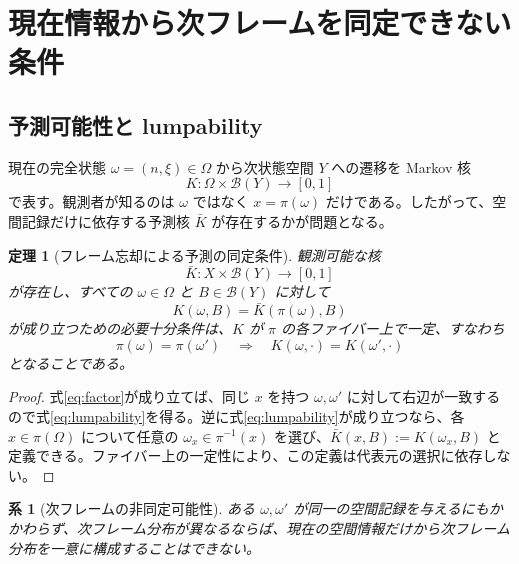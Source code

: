\documentclass[a4paper,11pt]{ltjsarticle}
\newtheorem{theorem}[definition]{定理}
\newtheorem{corollary}[definition]{系}
\theoremstyle{remark}
\begin{document}
\section{現在情報から次フレームを同定できない条件}

\subsection{予測可能性と lumpability}
現在の完全状態 $\omega=(n,\xi)\in\Omega$ から次状態空間 $Y$ への遷移を Markov 核
\begin{equation}
 K:\Omega\times\mathcal B(Y)\longrightarrow[0,1]
\end{equation}
で表す。観測者が知るのは $\omega$ ではなく $x=\pi(\omega)$ だけである。したがって、空間記録だけに依存する予測核 $\bar K$ が存在するかが問題となる。

\begin{theorem}[フレーム忘却による予測の同定条件]
観測可能な核
\begin{equation}
 \bar K:X\times\mathcal B(Y)\longrightarrow[0,1]
\end{equation}
が存在し、すべての $\omega\in\Omega$ と $B\in\mathcal B(Y)$ に対して
\begin{equation}
 K(\omega,B)=\bar K(\pi(\omega),B)
 \label{eq:factor}
\end{equation}
が成り立つための必要十分条件は、$K$ が $\pi$ の各ファイバー上で一定、すなわち
\begin{equation}
 \pi(\omega)=\pi(\omega')
 \quad\Longrightarrow\quad
 K(\omega,\cdot)=K(\omega',\cdot)
 \label{eq:lumpability}
\end{equation}
となることである。
\end{theorem}

\begin{proof}
式\eqref{eq:factor}が成り立てば、同じ $x$ を持つ $\omega,\omega'$ に対して右辺が一致するので式\eqref{eq:lumpability}を得る。逆に式\eqref{eq:lumpability}が成り立つなら、各 $x\in\pi(\Omega)$ について任意の $\omega_x\in\pi^{-1}(x)$ を選び、$\bar K(x,B):=K(\omega_x,B)$ と定義できる。ファイバー上の一定性により、この定義は代表元の選択に依存しない。
\end{proof}

\begin{corollary}[次フレームの非同定可能性]
ある $\omega,\omega'$ が同一の空間記録を与えるにもかかわらず、次フレーム分布が異なるならば、現在の空間情報だけから次フレーム分布を一意に構成することはできない。
\end{corollary}
\end{document}
